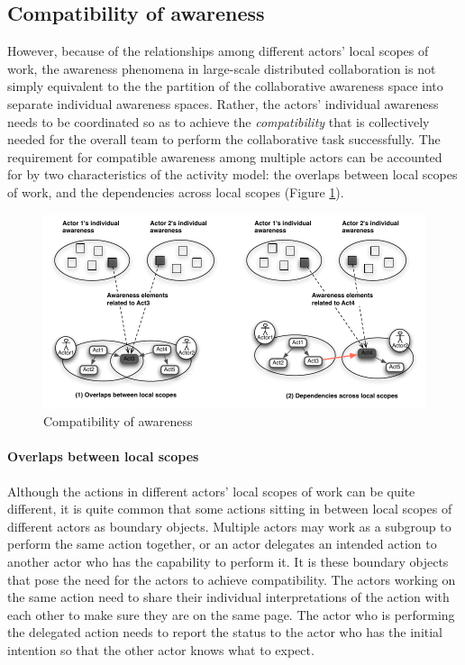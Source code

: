 \subsection{Compatibility of awareness} %
\label{sub:compatibility_of_awareness}
However, because of the relationships among different actors' local scopes of work, the awareness phenomena in large-scale distributed collaboration is not simply equivalent to the the partition of the collaborative awareness space into separate individual awareness spaces. Rather, the actors' individual awareness needs to be coordinated so as to achieve the \emph{compatibility} that is collectively needed for the overall team to perform the collaborative task successfully. The requirement for compatible awareness among multiple actors can be accounted for by two characteristics of the activity model: the overlaps between local scopes of work, and the dependencies across local scopes (Figure \ref{fig:compatibility_of_awareness}).

\begin{figure}[htbp] %
   \centering
   \includegraphics{compatibility_of_awareness.pdf} 
   \caption{Compatibility of awareness}
   \label{fig:compatibility_of_awareness}
\end{figure}

\paragraph*{Overlaps between local scopes} %
\label{par:overlaps_between_local_scopes}
Although the actions in different actors' local scopes of work can be quite different, it is quite common that some actions sitting in between local scopes of different actors as boundary objects. Multiple actors may work as a subgroup to perform the same action together, or an actor delegates an intended action to another actor who has the capability to perform it. It is these boundary objects that pose the need for the actors to achieve compatibility. The actors working on the same action need to share their individual interpretations of the action with each other to make sure they are on the same page. The actor who is performing the delegated action needs to report the status to the actor who has the initial intention so that the other actor knows what to expect. 

